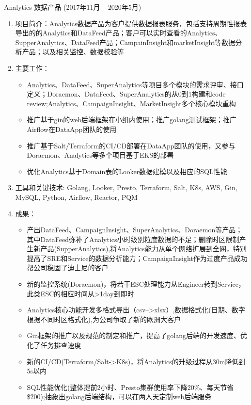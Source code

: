 \documentclass{resume}
\begin{document}
Analytics 数据产品 (2017年11月 -- 2020年5月)
\begin{enumerate}
  \item 项目简介：Analytics数据产品为客户提供数据报表服务，包括支持周期性报表导出的的Analytics和DataFeed产品；客户可以实时查看的Analytics、SupperAnalytics、DataFeed产品；CampainInsight和marketInsight等数据分析产品；以及相关监控、数据校验等
  \item 主要工作：
    \begin{itemize}
      \item Analytics、DataFeed、SuperAnalytics等项目多个模块的需求评审、接口定义；Doraemon、DataFeed、SuperAnalytics的从0到1构建和code review;Analytics、CampaignInsight、MarketInsight多个核心模块重构
      \item 推广基于gin的web后端框架在小组内使用；推广golang测试框架；推广Airflow在DataApp团队的使用
      \item 推广基于Salt/Terraform的CI/CD部署在DataApp团队的使用，又参与Doraemon、Analytics等多个项目基于EKS的部署
      \item 优化Analytics基于Domain表的Looker数据建模以及相应的SQL性能
    \end{itemize}
  \item 工具和关键技术: Golang, Looker, Presto, Terraform, Salt, K8s, AWS, Gin, MySQL, Python, Airflow, Reactor, PQM
  \item 成果：
    \begin{itemize}
      \item 产出DataFeed、CampaignInsight、SuperAnalytics、Doraemon等产品；其中DataFeed弥补了Analytics小时级别粒度数据的不足；删除时区限制产生新产品(SupperAnalytics),将Analytics能力从单个网络扩展到全网，特别提高了SRE和Service的数据分析能力；CampaignInsight作为过度产品成功帮公司稳固了迪士尼的客户
      \item 新的监控系统(Doraemon)，将若干ESC处理能力从Engineer转到Service，此类ESC的相应时间从>1day到即时
      \item Analytics核心功能开发多格式导出（csv-->xlsx）,数据格式化(日期、数字根据不同时区格式化),为公司争取了新的欧洲大客户
      \item Gin框架的推广以及规范的制定和推广，提高了golang后端的开发速度、优化了任务排查速度
      \item 新的CI/CD(Terraform/Salt->K8s)，将Analytics的升级过程从30m降低到5s以内
      \item SQL性能优化(整体提前2小时、Presto集群使用率下降20\%、每天节省\$200);抽象出golang后端结构，可以在两人天定制web后端服务
    \end{itemize}
\end{enumerate}
\end{document}
